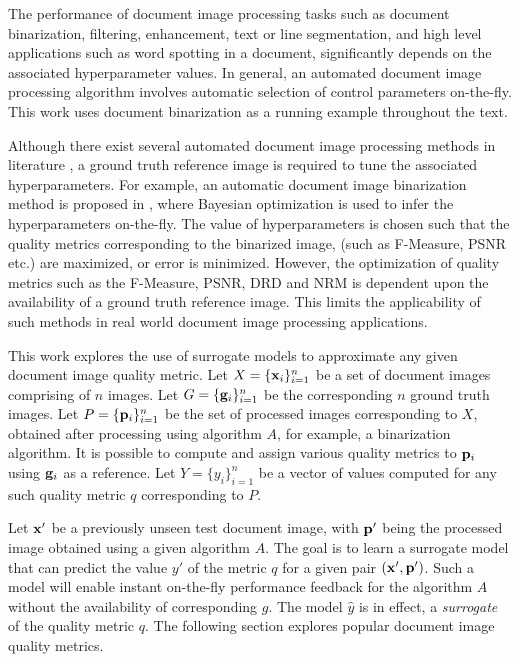 \documentclass[10pt, a4paper, conference, compsocconf]{IEEEtran}
\begin{document}
The performance of document image processing tasks such as document binarization, filtering, enhancement, text or line segmentation, and high level applications such as word spotting in a document, significantly depends on the associated hyperparameter values. In general, an automated document image processing algorithm involves automatic selection of control parameters on-the-fly. This work uses document binarization as a running example throughout the text. 

Although there exist several automated document image processing methods in literature \cite{vats2017automatic, howe2013document}, a ground truth reference image is required to tune the associated hyperparameters. For example, an automatic document image binarization method is proposed in \cite{vats2017automatic}, where Bayesian optimization is used to infer the hyperparameters on-the-fly. The value of hyperparameters is chosen such that the quality metrics corresponding to the binarized image, (such as F-Measure, PSNR etc.) are maximized, or error is minimized. However, the optimization of quality metrics such as the F-Measure, PSNR, DRD and NRM is dependent upon the availability of a ground truth reference image. This limits the applicability of such methods in real world document image processing applications.


This work explores the use of surrogate models to approximate any given document image quality metric. Let $X=\{{\bf x}_i\}_{i=1}^n$ be a set of document images comprising of $n$ images. Let $G=\{{\bf g}_i\}_{i=1}^n$ be the corresponding $n$ ground truth images. Let $P=\{{\bf p}_i\}_{i=1}^n$ be the set of processed images corresponding to $X$, obtained after processing using algorithm $A$, for example, a binarization algorithm. It is possible to compute and assign various quality metrics to ${\bf p}_i$ using ${\bf g}_i$ as a reference. Let $Y=\{y_i\}_{i=1}^n$ be a vector of values computed for any such quality metric $q$ corresponding to $P$. 

Let ${\bf x}'$ be a previously unseen test document image, with ${\bf p}'$ being the processed image obtained using a given algorithm $A$. The goal is to learn a surrogate model that can predict the value $y'$ of the metric $q$ for a given pair $({\bf x}', {\bf p}')$. Such a model will enable instant on-the-fly performance feedback for the algorithm $A$ without the availability of corresponding $g$. The model $\hat{y}$ is in effect, a \emph{surrogate} of the quality metric $q$. The following section explores popular document image quality metrics.
\end{document}
